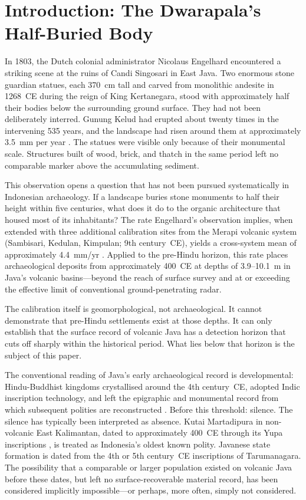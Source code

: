 \documentclass[12pt,a4paper]{article}
\begin{document}
\section{Introduction: The Dwarapala's Half-Buried Body}

In 1803, the Dutch colonial administrator Nicolaus Engelhard encountered a striking scene at the ruins of Candi Singosari in East Java. Two enormous stone guardian statues, each 370~cm tall and carved from monolithic andesite in 1268~CE during the reign of King Kertanegara, stood with approximately half their bodies below the surrounding ground surface. They had not been deliberately interred. Gunung Kelud had erupted about twenty times in the intervening 535 years, and the landscape had risen around them at approximately 3.5~mm per year \citep{kinney2003}. The statues were visible only because of their monumental scale. Structures built of wood, brick, and thatch in the same period left no comparable marker above the accumulating sediment.

This observation opens a question that has not been pursued systematically in Indonesian archaeology. If a landscape buries stone monuments to half their height within five centuries, what does it do to the organic architecture that housed most of its inhabitants? The rate Engelhard's observation implies, when extended with three additional calibration sites from the Merapi volcanic system (Sambisari, Kedulan, Kimpulan; 9th century~CE), yields a cross-system mean of approximately 4.4~mm/yr \citep[hereafter P1-core]{amien_p1core}. Applied to the pre-Hindu horizon, this rate places archaeological deposits from approximately 400~CE at depths of 3.9--10.1~m in Java's volcanic basins---beyond the reach of surface survey and at or exceeding the effective limit of conventional ground-penetrating radar.

The calibration itself is geomorphological, not archaeological. It cannot demonstrate that pre-Hindu settlements exist at those depths. It can only establish that the surface record of volcanic Java has a detection horizon that cuts off sharply within the historical period. What lies below that horizon is the subject of this paper.

The conventional reading of Java's early archaeological record is developmental: Hindu-Buddhist kingdoms crystallised around the 4th century~CE, adopted Indic inscription technology, and left the epigraphic and monumental record from which subsequent polities are reconstructed \citep{coedes1968,miksic2004}. Before this threshold: silence. The silence has typically been interpreted as absence. Kutai Martadipura in non-volcanic East Kalimantan, dated to approximately 400~CE through its Yupa inscriptions \citep{vogel1918}, is treated as Indonesia's oldest known polity. Javanese state formation is dated from the 4th or 5th century~CE inscriptions of Tarumanagara. The possibility that a comparable or larger population existed on volcanic Java before these dates, but left no surface-recoverable material record, has been considered implicitly impossible---or perhaps, more often, simply not considered.
\end{document}
